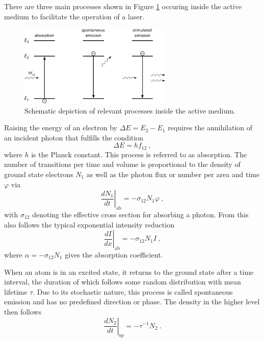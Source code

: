 There are three main processes shown in Figure \ref{fig:processes} occuring inside the active medium to facilitate the operation of a laser.

\begin{figure}[H]
	\centering
	\includegraphics[width=0.65\textwidth]{content/graphics/processes.pdf}
	\caption{Schematic depiction of relevant processes inside the active medium. \cite{Eichler_2018}}
	\label{fig:processes}
\end{figure}

Raising the energy of an electron by $\Delta E = E_2 - E_1$ requires the annihilation of an incident photon that fulfills the condition
\begin{equation*}
	\Delta E = hf_{12} \: ,
\end{equation*}
where $h$ is the Planck constant. This process is referred to as absorption. The number of transitions per time and volume is proportional
to the density of ground state electrons $N_1$ as well as the photon flux or number per area and time $\varphi$ via
\begin{equation*}
	\left. \frac{dN_1}{dt} \right|_\text{ab} = -\sigma_{12} N_1 \varphi \: ,
\end{equation*}
with $\sigma_{12}$ denoting the effective cross section for absorbing a photon. From this also follows the typical exponential intensity
reduction
\begin{equation*}
	\left. \frac{dI}{dx} \right|_\text{ab} = -\sigma_{12} N_1 I \: ,
\end{equation*}
where $\alpha = -\sigma_{12} N_1$ gives the absorption coefficient.

When an atom is in an excited state, it returns to the ground state after a time interval, the duration of which follows some random
distribution with mean lifetime $\tau$. Due to its stochastic nature, this process is called spontaneous emission and has no predefined
direction or phase. The density in the higher level then follows
\begin{equation*}
	\left. \frac{dN_2}{dt} \right|_\text{sp} = - \tau^{-1} N_2 \: .
\end{equation*}

